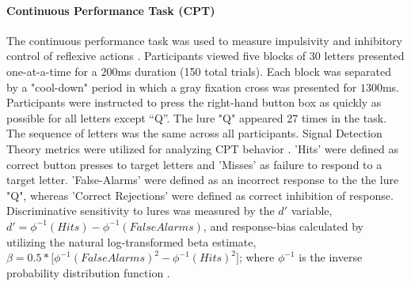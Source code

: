 \documentclass{article}%
\begin{document}
\paragraph*{Continuous Performance Task (CPT)} The continuous performance task was used to measure impulsivity and inhibitory control of reflexive actions \citep{horn2003response}.  Participants viewed five blocks of $30$ letters presented one-at-a-time for a $200$ms duration (150 total trials). Each block was separated by a "cool-down" period in which a gray fixation cross was presented for $1300$ms. Participants were instructed to press the right-hand button box as quickly as possible for all letters except “Q”. The lure "Q" appeared 27 times in the task. The sequence of letters was the same across all participants.  Signal Detection Theory metrics were utilized for analyzing CPT behavior \cite{stanislaw1999calculation}. 'Hits' were defined as correct button presses to target letters and 'Misses' as failure to respond to a target letter. 'False-Alarms' were defined as an incorrect response to the the lure "Q", whereas 'Correct Rejections' were defined as correct inhibition of response. Discriminative sensitivity to lures was measured by the $d'$ variable, $d'=\phi^{-1}( Hits ) - \phi^{-1}( False Alarms )$, and response-bias calculated by utilizing the natural log-transformed beta estimate, $ \beta = 0.5*\Big[\phi^{-1}(FalseAlarms)^{2} - \phi^{-1}(Hits)^{2}\Big]$; where $\phi^{-1}$ is the inverse probability distribution function  \citep{forbes2011statistical}. 
\end{document}
